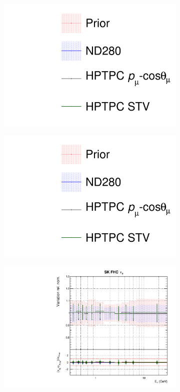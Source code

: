 \begin{figure}
\centering
\begin{subfigure}{0.3\textwidth}
  \centering
  \includegraphics[width=1.0\linewidth, trim={5mm  90mm 0mm 0mm}, clip]{figs/hptpcfits_leg}	
\end{subfigure}
\begin{subfigure}{0.3\textwidth}
  \centering
  \includegraphics[width=1.0\linewidth, trim={5mm  0mm 0mm 95mm}, clip]{figs/hptpcfits_leg}	
\end{subfigure}
\begin{subfigure}{0.45\textwidth}
  \centering
  \includegraphics[width=0.75\linewidth]{figs/hptpcfitsflux_8}

\end{subfigure}
\end{figure}
